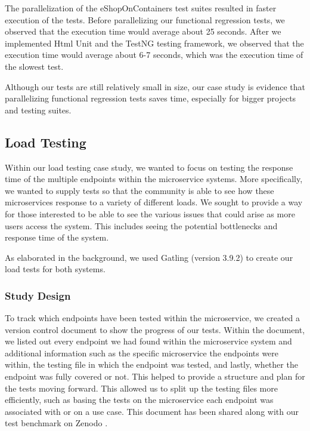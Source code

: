 The parallelization of the eShopOnContainers test suites resulted in faster execution of the tests. Before parallelizing our functional regression tests, we observed that the execution time would average about 25 seconds. After we implemented Html Unit and the TestNG testing framework, we observed that the execution time would average about 6-7 seconds, which was the execution time of the slowest test. 

Although our tests are still relatively small in size, our case study is evidence that parallelizing functional regression tests saves time, especially for bigger projects and testing suites.

\subsection{Load Testing}

Within our load testing case study, we wanted to focus on testing the response time of the multiple endpoints within the microservice systems. More specifically, we wanted to supply tests so that the community is able to see how these microservices response to a variety of different loads. We sought to provide a way for those interested to be able to see the various issues that could arise as more users access the system. This includes seeing the potential bottlenecks and response time of the system.

As elaborated in the background, we used Gatling (version 3.9.2) to create our load tests for both systems. %


\subsubsection{Study Design}

To track which endpoints have been tested within the microservice, we created a version control document to show the progress of our tests. Within the document, we listed out every endpoint we had found within the microservice system and additional information such as the specific microservice the endpoints were within, the testing file in which the endpoint was tested, and lastly, whether the endpoint was fully covered or not. This helped to provide a structure and plan for the tests moving forward. This allowed us to split up the testing files more efficiently, such as basing the tests on the microservice each endpoint was associated with or on a use case. This document has been shared along with our test benchmark on Zenodo \cite{zenodo_benchmark}.

